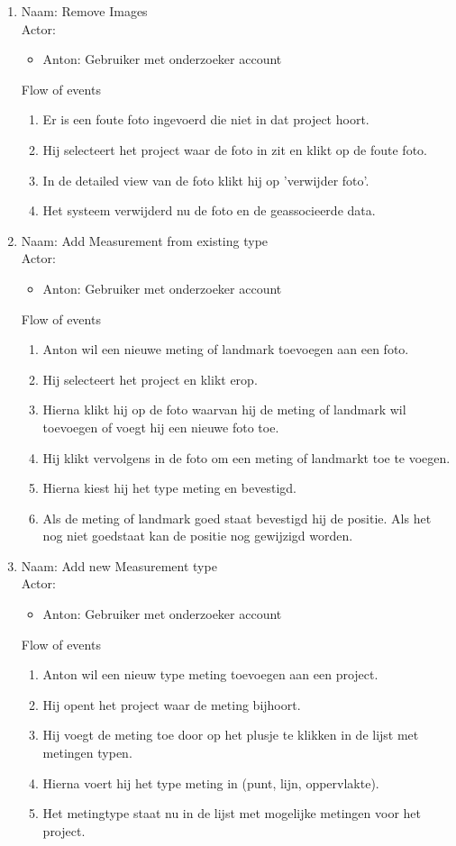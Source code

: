 \begin{enumerate}
\item   Naam: Remove Images \\
	Actor:
	\begin{itemize}
		\item Anton: Gebruiker met onderzoeker account
	\end{itemize}
	Flow of events
	\begin{enumerate}
		\item Er is een foute foto ingevoerd die niet in dat project hoort.
		\item Hij selecteert het project waar de foto in zit en klikt op de foute foto.
		\item In de detailed view van de foto klikt hij op 'verwijder foto'.
		\item Het systeem verwijderd nu de foto en de geassocieerde data.
	\end{enumerate}


\item   Naam: Add Measurement from existing type  \\
	Actor:
	\begin{itemize}
		\item Anton: Gebruiker met onderzoeker account
	\end{itemize}
	Flow of events
	\begin{enumerate}
		\item Anton wil een nieuwe meting of landmark toevoegen aan een foto.
		\item Hij selecteert het project en klikt erop.
		\item Hierna klikt hij op de foto waarvan hij de meting of landmark wil toevoegen of voegt hij een nieuwe foto toe.
		\item Hij klikt vervolgens in de foto om een meting of landmarkt toe te voegen.
		\item Hierna kiest hij het type meting en bevestigd.
		\item Als de meting of landmark goed staat bevestigd hij de positie. Als het nog niet goedstaat kan de positie nog gewijzigd worden.
	\end{enumerate}


\item   Naam: Add new Measurement type  \\
	Actor:
	\begin{itemize}
		\item Anton: Gebruiker met onderzoeker account
	\end{itemize}
	Flow of events
	\begin{enumerate}
		\item Anton wil een nieuw type meting toevoegen aan een project.
		\item Hij opent het project waar de meting bijhoort.
		\item Hij voegt de meting toe door op het plusje te klikken in de lijst met metingen typen.
		\item Hierna voert hij het type meting in (punt, lijn, oppervlakte).
		\item Het metingtype staat nu in de lijst met mogelijke metingen voor het project.
	\end{enumerate}



\end{enumerate}

